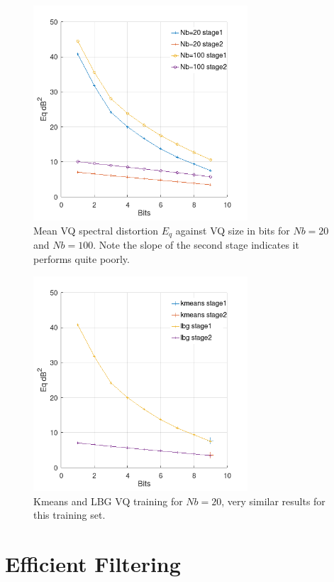 \documentclass{article}
\begin{document}
\begin{figure}[h]
\caption{Mean VQ spectral distortion $E_q$ against VQ size in bits for $Nb=20$ and $Nb=100$.  Note the slope of the second stage indicates it performs quite poorly.}
\label{fig:20_100_vq}
\begin{center}
\includegraphics[width=8cm]{20_100_vq.png}
\end{center}
\end{figure}

\begin{figure}[h]
\caption{Kmeans and LBG VQ training for $Nb=20$, very similar results for this training set.}
\label{fig:train_120_Nb20_K30_vq}
\begin{center}
\includegraphics[width=8cm]{train_120_Nb20_K30_vq.png}
\end{center}
\end{figure}

\section{Efficient Filtering}
\end{document}
